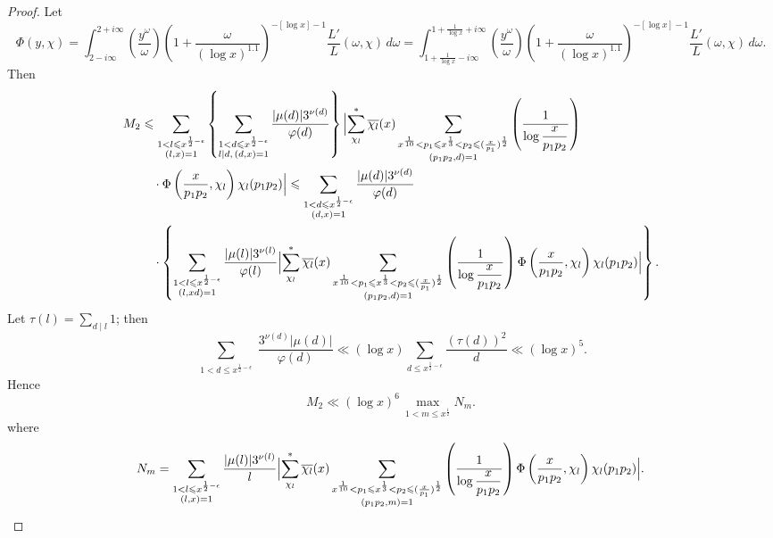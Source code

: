 \begin{proof}
Let
\[
\Phi(y,\chi)=\int_{2-i\infty}^{2+i\infty}\left(\frac{y^\omega}{\omega}\right)\left(1+\frac{\omega}{(\log x)^{1.1}}\right)^{-[\log x]-1}\frac{L'}{L}(\omega,\chi)\,d\omega
=\int_{1+\frac1{\log x}-i\infty}^{1+\frac1{\log x}+i\infty}\left(\frac{y^\omega}{\omega}\right)\left(1+\frac{\omega}{(\log x)^{1.1}}\right)^{-[\log x]-1}\frac{L'}{L}(\omega,\chi)\,d\omega.
\]
Then
\begin{align*}
M_2&\leqslant\sum_{\substack{1<l\leqslant x^{\frac12-\epsilon}\\(l,x)=1}}\left\{\sum_{\substack{1<d\leqslant x^{\frac12-\epsilon}\\l\mid d,\,(d,x)=1}}\frac{|\mu(d)|3^{\nu(d)}}{\varphi(d)}\right\}
\Bigl|\sum_{\chi_l}^{*}\overline{\chi_l}(x)\sum_{\substack{x^{\frac1{10}}<p_1\leqslant x^{\frac13}<p_2\leqslant(\frac{x}{p_1})^{\frac12}\\(p_1p_2,d)=1}}\left(\frac1{\log\dfrac{x}{p_1p_2}}\right)\\
&\quad\cdot\Phi\left(\frac{x}{p_1p_2},\chi_l\right)\chi_l(p_1p_2)\Bigr|
\leqslant\sum_{\substack{1<d\leqslant x^{\frac12-\epsilon}\\(d,x)=1}}\frac{|\mu(d)|3^{\nu(d)}}{\varphi(d)}\\
&\quad\cdot\left\{\sum_{\substack{1<l\leqslant x^{\frac12-\epsilon}\\(l,xd)=1}}\frac{|\mu(l)|3^{\nu(l)}}{\varphi(l)}\Bigl|\sum_{\chi_l}^{*}\overline{\chi_l}(x)\sum_{\substack{x^{\frac1{10}}<p_1\leqslant x^{\frac13}<p_2\leqslant(\frac{x}{p_1})^{\frac12}\\(p_1p_2,d)=1}}\left(\frac1{\log\dfrac{x}{p_1p_2}}\right)\Phi\left(\frac{x}{p_1p_2},\chi_l\right)\chi_l(p_1p_2)\Bigr|\right\}.
\end{align*}
Let $\tau(l)=\displaystyle\sum_{d\mid l}1$; then
\[
\sum_{\substack{1<d\leqslant x^{\frac12-\epsilon}}}\frac{3^{\nu(d)}|\mu(d)|}{\varphi(d)}\ll(\log x)\sum_{d\leqslant x^{\frac12-\epsilon}}\frac{(\tau(d))^2}{d}\ll(\log x)^5.
\]
Hence
\begin{equation}\label{eq:chen12en}
M_2\ll(\log x)^6\,\underset{1<m\leqslant x^{\frac12}}{\max}N_m.
\end{equation}
where
\[
N_m=\sum_{\substack{1<l\leqslant x^{\frac12-\epsilon}\\(l,x)=1}}\frac{|\mu(l)|3^{\nu(l)}}{l}
\Bigl|\sum_{\chi_l}^{*}\overline{\chi_l}(x)\sum_{\substack{x^{\frac1{10}}<p_1\leqslant x^{\frac13}<p_2\leqslant(\frac{x}{p_1})^{\frac12}\\(p_1p_2,m)=1}}\left(\frac1{\log\dfrac{x}{p_1p_2}}\right)\Phi\left(\frac{x}{p_1p_2},\chi_l\right)\chi_l(p_1p_2)\Bigr|.
\]
\end{proof}
